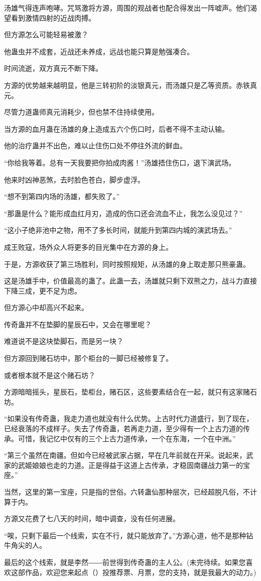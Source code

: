 \begin{this_body}
汤雄气得连声咆哮。咒骂激将方源，周围的观战者也配合得发出一阵嘘声。他们渴望看到激情四射的近战肉搏。

但方源怎么可能轻易被激？

他蛊虫并不成套，近战还未养成，远战也能只算是勉强凑合。

时间流逝，双方真元不断下降。

方源的优势越来越明显，他是三转初阶的淡银真元，而汤雄只是乙等资质。赤铁真元。

尽管力道蛊师真元消耗少，但也禁不住持续使用。

当方源的血月蛊在汤雄的身上造成五六个伤口时，后者不得不主动认输。

他的治疗蛊并不出色，难以止住伤口处不停往外流的鲜血。

“你给我等着。总有一天我要把你拍成肉酱！”汤雄捂住伤口，退下演武场。

他来时凶神恶煞，去时脸色苍白，脚步虚浮。

“想不到第四内场的汤雄，都失败了。”

“那蛊是什么？能形成血红月刃，造成的伤口还会流血不止，我怎么没见过？”

“这小子绝非池中之物，用不了多长时间，就能升到第四内城的演武场去。”

成王败寇，场外众人将更多的目光集中在方源的身上。

于是，方源收获了第三场胜利，同时按照规矩，从汤雄的身上取走那只熊豪蛊。

这是汤雄手中，价值最高的蛊了。此蛊一去，汤雄就只剩下双熊之力，战斗力直接下降三成，更不足为虑。

但方源心中却高兴不起来。

传奇蛊并不在垫脚的星辰石中，又会在哪里呢？

难道说不是这块垫脚石，而是另一块？

但方源回到赌石坊中，那个柜台的一脚已经被修复了。

或者根本就不是这个赌石坊？

方源暗暗摇头，星辰石，垫柜台，赌石区，这些要素结合在一起，就只有这家赌石坊。

“如果没有传奇蛊，我走力道也就没有什么优势。上古时代力道盛行，到了现在，已经衰落的不成样子。失去了传奇蛊，若再走力道，至少得有一个上古力道的传承。可惜，我记忆中仅有的三个上古力道传承，一个在东海，一个在中洲。”

“第三个虽然在南疆。但如今已经被武家占据，早在几年前就在开采。说起来，武家的武姬娘娘也走的力道。正是得益于这道上古传承，才稳固南疆战力第一的宝座。”

当然，这里的第一宝座，只是指的世俗。六转蛊仙那种层次，已经超脱凡俗，不计算于内。

方源又花费了七八天的时间，暗中调查，没有任何进展。

“唉，只剩下最后一个线索，实在不行，就只能放弃了。”方源心道，他不是那种钻牛角尖的人。

最后的这个线索，就是李然――前世得到传奇蛊的主人公。(未完待续。如果您喜欢这部作品，欢迎您来起点（）投推荐票、月票，您的支持，就是我最大的动力。)

\end{this_body}

